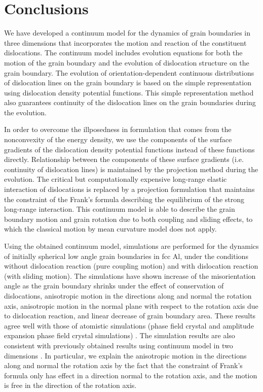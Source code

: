 \section{Conclusions}\label{sec:con}
We have developed a continuum model for the dynamics of grain boundaries in three dimensions that incorporates the motion and reaction of the constituent dislocations. The continuum model includes evolution equations for both the motion of the grain boundary and the evolution of dislocation structure on the grain boundary. The evolution of orientation-dependent continuous distributions of dislocation lines on the grain boundary is based on the simple representation using dislocation density potential functions. This simple representation method also guarantees continuity of the dislocation lines on the grain boundaries during the evolution.

In order to overcome the illposedness in formulation that comes from the nonconvexity of the energy density, we use the components of the surface gradients of the dislocation density potential functions instead of these functions directly. Relationship between the components of these surface gradients (i.e. continuity of dislocation lines) is maintained by the projection method during the evolution. The critical but computationally expensive long-range elastic interaction of dislocations is replaced by a projection formulation that maintains the constraint of the Frank's formula describing the equilibrium of the strong long-range interaction. This continuum model is able to describe the grain boundary motion and grain rotation due to both coupling and sliding effects, to which the classical motion by mean curvature model does not apply.

Using the obtained continuum model, simulations are performed for the dynamics of initially spherical low angle grain boundaries in fcc Al, under the conditions without dislocation reaction (pure coupling motion) and with dislocation reaction (with sliding motion). The simulations have shown increase of the misorientation angle as the grain boundary shrinks under the effect of conservation of dislocations, anisotropic motion in the directions along and normal the rotation axis, anisotropic motion in the normal plane with respect to the rotation axis due to dislocation reaction, and linear decrease of grain boundary area.  These results
agree well with those of atomistic simulations (phase field crystal and amplitude expansion phase field crystal simulations) \cite{yamanaka2017phase,salvalaglio2018defects}. The simulation results are also consistent with previously obtained results using continuum model in two dimensions \cite{zhang2018motion,zhang2019new}. In particular, we explain the anisotropic motion in the directions along and normal the rotation axis by the fact that the constraint of Frank's formula only has effect in a direction normal to the rotation axis, and the motion is free in the direction of the rotation axis.

